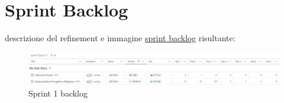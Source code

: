 \section{Sprint Backlog}
descrizione del refinement e immagine \href{https://github.com/orgs/ISIQuiz/projects/3/}{sprint backlog} risultante:

\begin{figure}[H]
    \centering
    \includegraphics[width=\textwidth]{process/Img/Sprint1BL.jpg}
    \caption{Sprint 1 backlog}
    \label{fig:Sprint1}
\end{figure}
